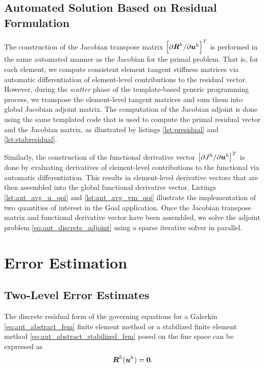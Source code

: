\subsection{Automated Solution Based on Residual Formulation}

The construction of the Jacobian transpose matrix $\left[ \partial \boldsymbol{R}^h
/ \partial \boldsymbol{u}^h \right]^T$ is performed in the same automated manner as
the Jacobian for the primal problem. That is, for each element, we compute
consistent element tangent stiffness matrices via automatic differentiation
of element-level contributions to the residual vector. However, during the
\emph{scatter} phase of the template-based generic programming process,
we transpose the element-level tangent matrices and
sum them into global Jacobian adjoint matrix. The computation of the Jacobian
adjoint is done using the same templated code that is used to compute
the primal residual vector and the Jacobian matrix, as illustrated by
listings \ref{lst:presidual} and \ref{lst:stabresidual}.

Similarly, the construction of the functional derivative vector
$\left[ \partial J^h / \partial \boldsymbol{u}^h \right]^T$ is done by evaluating
derivatives of element-level contributions to the functional via automatic
differentiation. This results in element-level derivative vectors that are
then assembled into the global functional derivative vector. Listings
\ref{lst:aut_avg_u_qoi} and \ref{lst:aut_avg_vm_qoi} illustrate the
implementation of two quantities of interest in the Goal application. Once
the Jacobian transpose matrix and functional derivative vector have been
assembled, we solve the adjoint problem \eqref{eq:aut_discrete_adjoint} using
a sparse iterative solver in parallel.

\section{Error Estimation}

\subsection{Two-Level Error Estimates}

The discrete residual form of the governing equations for a Galerkin
\eqref{eq:aut_abstract_fem} finite element method or a stabilized finite
element method \eqref{eq:aut_abstract_stabilized_fem} posed on the fine
space can be expressed as
%
\begin{gather}
\boldsymbol{R}^h(\boldsymbol{u}^h) = \boldsymbol{0}.
\label{eq:aut_fine_resid}
\end{gather}
%

